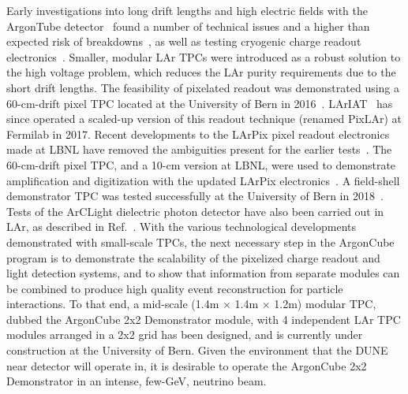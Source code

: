 Early investigations into long drift lengths and high electric fields with the ArgonTube detector~\cite{argontube_design} found a number of technical issues and a higher than expected risk of breakdowns~\cite{argontube}, as well as testing cryogenic charge readout electronics~\cite{art_cold_ero}. Smaller, modular LAr TPCs were introduced as a robust solution to the high voltage problem, which reduces the LAr purity requirements due to the short drift lengths. The feasibility of pixelated readout was demonstrated using a 60-cm-drift pixel TPC located at the University of Bern in 2016~\cite{pixels}. LArIAT~\cite{lariat} has since operated a scaled-up version of this readout technique (renamed PixLAr) at Fermilab in 2017. Recent developments to the LArPix pixel readout electronics made at LBNL have removed the ambiguities present for the earlier tests~\cite{larpix}. The 60-cm-drift pixel TPC, and a 10-cm version at LBNL, were used to demonstrate amplification and digitization with the updated LArPix electronics~\cite{larpix}. A field-shell demonstrator TPC was tested successfully at the University of Bern in 2018~\addcite {}. Tests of the ArCLight dielectric photon detector have also been carried out in LAr, as described in Ref.~\cite{arclight}. With the various technological developments demonstrated with small-scale TPCs, the next necessary step in the ArgonCube program is to demonstrate the scalability of the pixelized charge readout and light detection systems, and to show that information from separate modules can be combined to produce high quality event reconstruction for particle interactions. To that end, a mid-scale (1.4m $\times$ 1.4m $\times$ 1.2m) modular TPC, dubbed the ArgonCube 2x2 Demonstrator module, with 4 independent LAr TPC modules arranged in a 2x2 grid has been designed, and is currently under construction at the University of Bern. Given the environment that the DUNE near detector will operate in, it is desirable to operate the ArgonCube 2x2 Demonstrator in an intense, few-GeV, neutrino beam.

